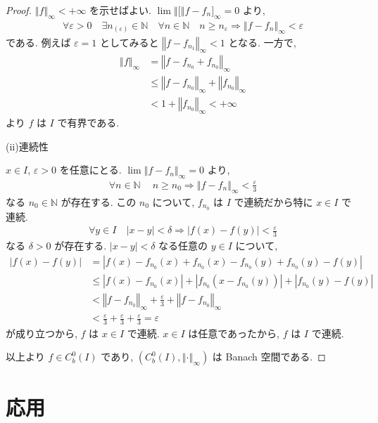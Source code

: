 \documentclass[openany, a4paper, oneside]{jsbook}
\theoremstyle{break}
\theoremstyle{breakdefn}
\newcommand{\abs}[1]{\left|#1\right|}
\newcommand{\norm}[1]{\left\Vert#1\right\Vert}
\newcommand{\bbN}{\mathbb{N}}
\begin{document}
\begin{proof}
$\norm{f}_{\infty} < +\infty$ を示せばよい.
$\lim \norm[f - f_n]_{\infty} = 0$ より,
\begin{align*}
 \forall \varepsilon > 0 \quad
 \exists n_{(\varepsilon)} \in \bbN \quad
 \forall n \in \bbN \quad
 n  \geq  n_{\varepsilon}
 \Rightarrow
 \norm{f - f_n}_{\infty}
 <
 \varepsilon
\end{align*}
である.
例えば $\varepsilon = 1$ としてみると $\norm{f - f_{n_{1}}}_{\infty} < 1$ となる.
一方で,
\begin{align*}
 \norm{f}_{\infty}
 &=
 \norm{f - f_{n_0} + f_{n_0}}_{\infty} \\
 &\leq
 \norm{f - f_{n_0}}_{\infty} + \norm{f_{n_0}}_{\infty} \\
 &<
 1 + \norm{f_{n_0}}_{\infty}
 <
 +\infty
\end{align*}
より $f$ は $I$ で有界である.

(ii)連続性

$x\in I$, $\varepsilon > 0$ を任意にとる.
$\lim \norm{f - f_n}_{\infty} = 0$ より,
\begin{align*}
 \forall n\in\mathbb{N}\ \quad
 n \geq n_{0}
 \Rightarrow
 \norm{f - f_n}_{\infty}
 <
 \frac{\varepsilon}{3}
\end{align*}
なる $n_0 \in \bbN$ が存在する.
この $n_0$ について, $f_{n_0}$ は $I$ で連続だから特に $x \in I$ で連続.
\begin{align*}
 \forall y \in I \quad
 \abs{x - y}
 <
 \delta
 \Rightarrow
 \abs{f(x) - f(y)}
 <
 \frac{\varepsilon}{3}
\end{align*}
なる $\delta > 0$ が存在する.
$\abs{x - y} < \delta$ なる任意の $y \in I$ について,
\begin{align*}
 \abs{f(x)-f(y)}
 &=
 \abs{f(x) - f_{n_0}(x) + f_{n_0}(x) - f_{n_0}(y) + f_{n_0}(y) - f(y)} \\
 &\leq
 \abs{f(x) - f_{n_0}(x)} + \abs{f_{n_0}(x - f_{n_0}(y))} + \abs{f_{n_0}(y) - f(y)} \\
 &<
 \norm{f - f_{n_0}}_{\infty} + \frac{\varepsilon}{3} + \norm{f - f_{n_0}}_{\infty} \\
 &<
 \frac{\varepsilon}{3} + \frac{\varepsilon}{3} + \frac{\varepsilon}{3}
 =
 \varepsilon
\end{align*}
が成り立つから, $f$ は $x \in I$ で連続.
$x \in I$ は任意であったから, $f$ は $I$ で連続.

以上より $f \in C^0_b(I)$ であり, $(C^0_b(I), \norm{\cdot}_{\infty})$ は Banach 空間である.
\end{proof}
\section{応用}
\end{document}
